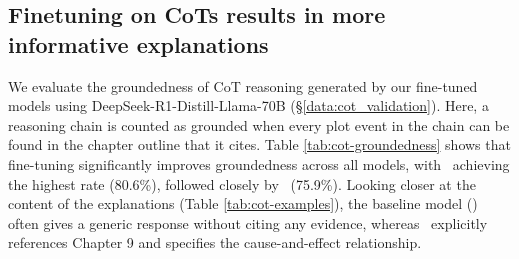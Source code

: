 \subsection{Finetuning on CoTs results in more informative explanations}
We evaluate the groundedness of CoT reasoning generated by our fine-tuned models using DeepSeek-R1-Distill-Llama-70B (\S\ref{data:cot_validation}). Here, a reasoning chain is counted as grounded when every plot event in the chain can be found in the chapter outline that it cites. Table \ref{tab:cot-groundedness} shows that fine-tuning significantly improves groundedness across all models, with \prolongftbalanced\ achieving the highest rate (80.6\%), followed closely by \llamaftbalanced\ (75.9\%). Looking closer at the content of the explanations (Table \ref{tab:cot-examples}), the baseline model (\llamainst) often gives a generic response without citing any evidence, whereas \llamaftbalanced\ explicitly references Chapter 9 and specifies the cause-and-effect relationship.





